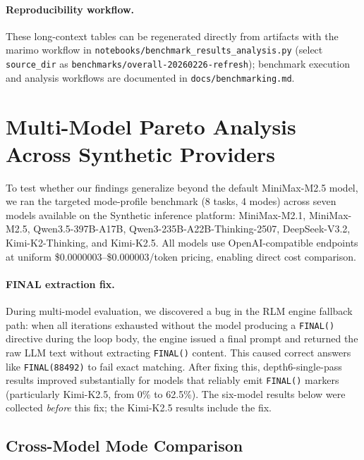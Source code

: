 \documentclass[11pt]{article}
\begin{document}
\paragraph{Reproducibility workflow.}
These long-context tables can be regenerated directly from artifacts with the marimo workflow in \texttt{notebooks/benchmark\_results\_analysis.py} (select \texttt{source\_dir} as \texttt{benchmarks/overall-20260226-refresh}); benchmark execution and analysis workflows are documented in \texttt{docs/benchmarking.md}.

\section{Multi-Model Pareto Analysis Across Synthetic Providers}

To test whether our findings generalize beyond the default MiniMax-M2.5 model, we ran the targeted mode-profile benchmark (8 tasks, 4 modes) across seven models available on the Synthetic inference platform: MiniMax-M2.1, MiniMax-M2.5, Qwen3.5-397B-A17B, Qwen3-235B-A22B-Thinking-2507, DeepSeek-V3.2, Kimi-K2-Thinking, and Kimi-K2.5. All models use OpenAI-compatible endpoints at uniform \$0.0000003--\$0.000003/token pricing, enabling direct cost comparison.

\paragraph{FINAL extraction fix.} During multi-model evaluation, we discovered a bug in the RLM engine fallback path: when all iterations exhausted without the model producing a \texttt{FINAL()} directive during the loop body, the engine issued a final prompt and returned the raw LLM text without extracting \texttt{FINAL()} content. This caused correct answers like \texttt{FINAL(88492)} to fail exact matching. After fixing this, depth6-single-pass results improved substantially for models that reliably emit \texttt{FINAL()} markers (particularly Kimi-K2.5, from 0\% to 62.5\%). The six-model results below were collected \emph{before} this fix; the Kimi-K2.5 results include the fix.

\subsection{Cross-Model Mode Comparison}
\end{document}
